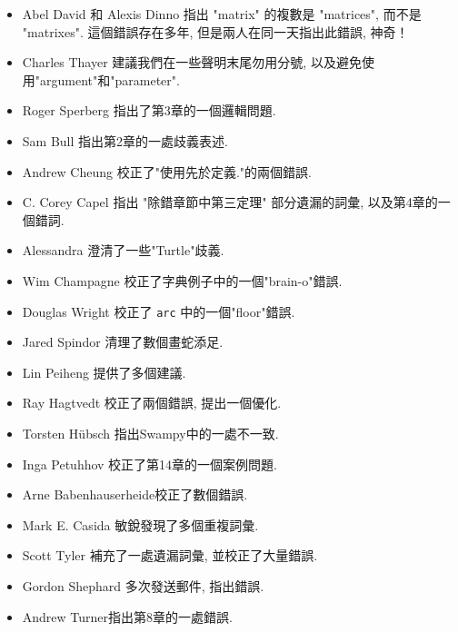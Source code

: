 \documentclass[10pt]{book}
\begin{document}
\begin{itemize}
\item Abel David 和 Alexis Dinno 指出 "matrix" 的複數是 "matrices", 
而不是 "matrixes". 這個錯誤存在多年, 但是兩人在同一天指出此錯誤, 神奇！

\item Charles Thayer 建議我們在一些聲明末尾勿用分號, 以及避免使用"argument"和"parameter". 

\item Roger Sperberg 指出了第3章的一個邏輯問題. 

\item Sam Bull 指出第2章的一處歧義表述. 

\item Andrew Cheung 校正了"使用先於定義."的兩個錯誤.

\item C. Corey Capel 指出 "除錯章節中第三定理" 部分遺漏的詞彙, 
以及第4章的一個錯詞. 

\item Alessandra 澄清了一些"Turtle"歧義. 

\item Wim Champagne 校正了字典例子中的一個"brain-o"錯誤. 

\item Douglas Wright 校正了 {\tt arc} 中的一個"floor"錯誤. 

\item Jared Spindor 清理了數個畫蛇添足. 

\item Lin Peiheng 提供了多個建議. 

\item Ray Hagtvedt 校正了兩個錯誤, 提出一個優化. 

\item Torsten H\"{u}bsch 指出Swampy中的一處不一致. 

\item Inga Petuhhov 校正了第14章的一個案例問題. 

\item Arne Babenhauserheide校正了數個錯誤. 

\item Mark E. Casida 敏銳發現了多個重複詞彙. 

\item Scott Tyler 補充了一處遺漏詞彙, 並校正了大量錯誤. 

\item Gordon Shephard 多次發送郵件, 指出錯誤. 

\item Andrew Turner指出第8章的一處錯誤. 


\end{itemize}
\end{document}
